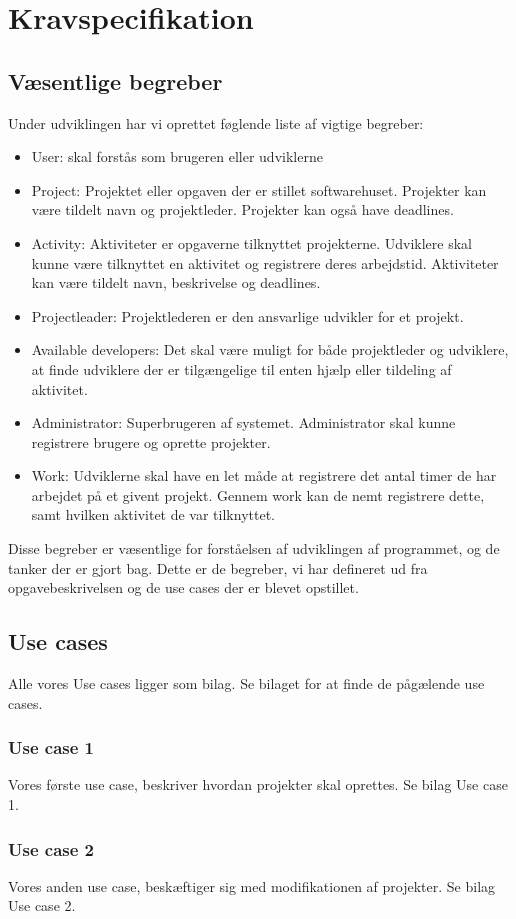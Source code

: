 \documentclass[a4paper,12pt]{article}
\begin{document}
\section{Kravspecifikation}
\subsection{Væsentlige begreber}
Under udviklingen har vi oprettet føglende liste af vigtige begreber:
\begin{itemize}
\item User: skal forstås som brugeren eller udviklerne
\item Project: Projektet eller opgaven der er stillet softwarehuset. Projekter kan være tildelt navn og projektleder. Projekter kan også have deadlines.
\item Activity: Aktiviteter er opgaverne tilknyttet projekterne. Udviklere skal kunne være tilknyttet en aktivitet og registrere deres arbejdstid. Aktiviteter kan være tildelt navn, beskrivelse og deadlines.
\item Projectleader: Projektlederen er den ansvarlige udvikler for et projekt.
\item Available developers: Det skal være muligt for både projektleder og udviklere, at finde udviklere der er tilgængelige til enten hjælp eller tildeling af aktivitet.
\item Administrator: Superbrugeren af systemet. Administrator skal kunne registrere brugere og oprette projekter.
\item Work: Udviklerne skal have en let måde at registrere det antal timer de har arbejdet på et givent projekt. Gennem work kan de nemt registrere dette, samt hvilken aktivitet de var tilknyttet.
\end{itemize}
Disse begreber er væsentlige for forståelsen af udviklingen af programmet, og de tanker der er gjort bag. Dette er de begreber, vi har defineret ud fra opgavebeskrivelsen og de use cases der er blevet opstillet.
\subsection{Use cases}
Alle vores Use cases ligger som bilag. Se bilaget for at finde de pågælende use cases.
\subsubsection*{Use case 1}
Vores første use case, beskriver hvordan projekter skal oprettes. Se bilag Use case 1.
\subsubsection*{Use case 2}
Vores anden use case, beskæftiger sig med modifikationen af projekter. Se bilag Use case 2.
\end{document}
